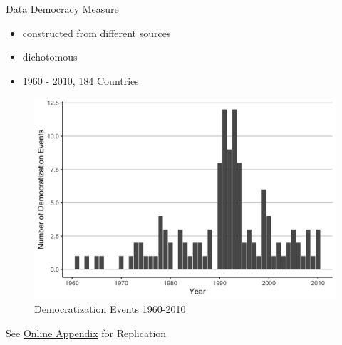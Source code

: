 \documentclass[
  ignorenonframetext,
]{beamer}
\providecommand{\tightlist}{%
  \setlength{\itemsep}{0pt}\setlength{\parskip}{0pt}}\usepackage{longtable,booktabs,array}
\begin{document}
\begin{frame}{Data}
\protect\hypertarget{data}{}
Democracy Measure

\begin{itemize}
\tightlist
\item
  constructed from different sources
\item
  dichotomous
\item
  1960 - 2010, 184 Countries
\end{itemize}

\begin{figure}

{\centering \includegraphics{output/figureDem.png}

}

\caption{Democratization Events 1960-2010}

\end{figure}

See
\href{https://skriptum.github.io/DDCG/vortrag/4-Figure2.html\#plot}{Online
Appendix} for Replication
\end{frame}
\end{document}
